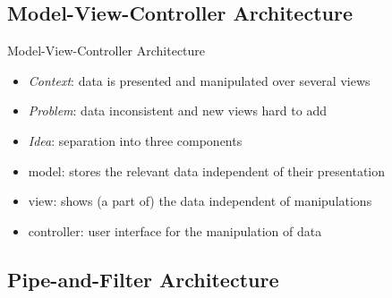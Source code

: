\subsection{Model-View-Controller Architecture}
\begin{frame}{\insertsubsection}
	\begin{fancycolumns}[animation=none]
		\begin{definition}{Model-View-Controller Architecture \mysource{\sommerville}}
			\begin{itemize}
				\item \emph{Context}: data is presented and manipulated over several views
				\item \emph{Problem}: data inconsistent and new views hard to add
				\item \emph{Idea}: separation into three components
				\item model: stores the relevant data independent of their presentation
				\item view: shows (a part of) the data independent of manipulations
				\item controller: user interface for the manipulation of data
			\end{itemize}
		\end{definition}
		\vspace{-1mm}
		\nextcolumn
	\end{fancycolumns}
\end{frame}

\subsection{Pipe-and-Filter Architecture}
\begin{frame}{\insertsubsection}
	\slidePipeAndFilter
\end{frame}

